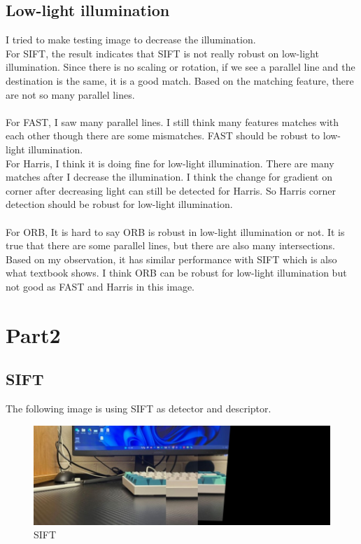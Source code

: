 \documentclass{article}
\begin{document}
\subsection*{Low-light illumination}
I tried to make testing image to decrease the illumination.\\
For SIFT, the result indicates that SIFT is not really robust on low-light illumination.
Since there is no scaling or rotation, if we see a parallel line and the destination is the same, it is a good match.
Based on the matching feature, there are not so many parallel lines.\\
\\
For FAST, I saw many parallel lines.
I still think many features matches with each other though there are some mismatches.
FAST should be robust to low-light illumination.
\\
For Harris, I think it is doing fine for low-light illumination.
There are many matches after I decrease the illumination.
I think the change for gradient on corner after decreasing light can still be detected for Harris.
So Harris corner detection should be robust for low-light illumination.\\
\\
For ORB, It is hard to say ORB is robust in low-light illumination or not.
It is true that there are some parallel lines, but there are also many intersections.
Based on my observation, it has similar performance with SIFT which is also what textbook shows.
I think ORB can be robust for low-light illumination but not good as FAST and Harris in this image.
\section*{Part2}
\subsection*{SIFT}
The following image is using SIFT as detector and descriptor.
\begin{figure}[ht!]
  \begin{center}
    \includegraphics[scale=0.4]{SIFT-result.jpg}
    \caption[short]{SIFT}
    \label{fig:sift}
  \end{center} 
\end{figure}
\end{document}
